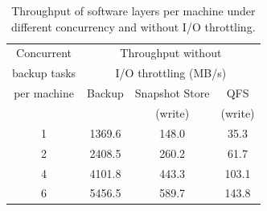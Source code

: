 \begin{table}[t]
  \centering
\begin{small}
    \begin{tabular}{|c|ccc|}
\hline
    Concurrent      & \multicolumn{3}{c|}{Throughput without}    \\
    backup tasks            & \multicolumn{3}{c|}{I/O throttling (MB/s)} \\ \cline{2-4}
    per machine                & Backup                                     & Snapshot Store & QFS  \\ 
    		&                                      & (write) & (write)  \\ \hline
    1                       & 1369.6                                     & 148.0          & 35.3 \\
    2                       & 2408.5                                     & 260.2          & 61.7 \\
    4                       & 4101.8                                     & 443.3          & 103.1 \\
    6                       & 5456.5                                     & 589.7          & 143.8 \\ \hline
    \end{tabular}
\end{small}
\caption{Throughput of software layers per machine under different concurrency and without I/O throttling.}
\label{tab:throughput}
\end{table}

